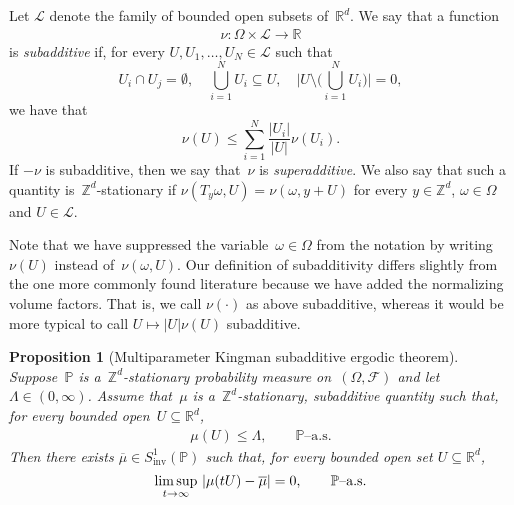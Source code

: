 \documentclass[11pt]{article} %
\numberwithin{equation}{section}
\newtheorem{proposition}[theorem]{Proposition}
\theoremstyle{definition}
\let\originalleft\left
\let\originalright\right
\renewcommand{\left}{\mathopen{}\mathclose\bgroup\originalleft}
\renewcommand{\right}{\aftergroup\egroup\originalright}
\newcommand*{\R}{\ensuremath{\mathbb{R}}}
\newcommand*{\Zd}{\ensuremath{\mathbb{Z}^d}}
\newcommand*{\Rd}{\ensuremath{\mathbb{R}^d}}
\newcommand{\F}{\mathcal{F}}
\renewcommand{\P}{\mathbb{P}}
\begin{document}
Let $\mathcal{L}$ denote the family of bounded open subsets of~$\Rd$. We say that a function
\begin{align*}
\nu:\Omega \times \mathcal{L} \to \R
\end{align*}
is \emph{subadditive} if, for every $U, U_1,\ldots,U_N \in \mathcal{L}$ such that 
\begin{equation}
\label{e.U.partition}
U_i \cap U_j = \emptyset,  \quad
\bigcup_{i=1}^N U_i \subseteq U, \quad 
\Biggl| U \setminus \biggl (\bigcup_{i=1}^N U_i \biggr) \Biggr| = 0, 
\end{equation}
we have that 
\begin{equation}
\label{e.nu.subadd}
\nu(U) \leq \sum_{i=1}^N \frac{|U_i|}{|U|} \nu(U_i) .
\end{equation}
If $-\nu$ is subadditive, then we say that~$\nu$ is \emph{superadditive}. We also say that such a quantity is~$\Zd$-stationary if $\nu(T_y\omega,U) = \nu(\omega, y+ U)$ for every $y\in\Zd$, $\omega\in\Omega$ and $U\in\mathcal{L}$.

\smallskip

Note that we have suppressed the variable~$\omega \in\Omega$ from the notation by writing~$\nu(U)$ instead of~$\nu(\omega,U)$. 
Our definition of subadditivity differs slightly from the one more commonly found literature because we have added the normalizing volume factors. That is, we call $\nu(\cdot)$ as above subadditive, whereas it would be more typical to call $U \mapsto  |U| \nu(U)$ subadditive. 



\begin{proposition}[Multiparameter Kingman subadditive ergodic theorem]
\label{p.subadditive.ergodic}
Suppose~$\P$ is a~$\Zd$-stationary probability measure on~$(\Omega,\F)$ and let~$\Lambda\in (0,\infty)$. Assume that~$\mu$ is a~$\Zd$-stationary, subadditive quantity such that, for every bounded open~$U\subseteq\Rd$, 
\begin{align}
\label{e.subaddmu.bounded}
\mu(U)  \leq \Lambda, \qquad \mbox{$\P$--a.s.}
\end{align} 
Then there exists $\overline{\mu} \in S^1_{\mathrm{inv}}(\P)$ such that, for every bounded open set $U\subseteq \Rd$, 
\begin{equation}
\label{e.subadditive.ergodic}
\limsup_{t\to\infty} \
\left| \mu(tU) - \overline{\mu} \right| = 0, 
\qquad 
\mbox{$\P$--a.s.}
\end{equation}
\end{proposition}
\end{document}
